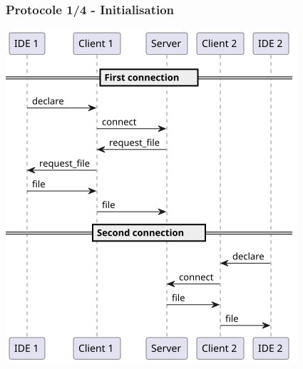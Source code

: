 \documentclass{beamer}
\begin{document}
\begin{frame}
    \frametitle{Protocole 1/4 - Initialisation}
    \includegraphics[width=\textwidth,height=0.8\textheight,keepaspectratio]{diagrams/1.png}
\end{frame}
\end{document}
